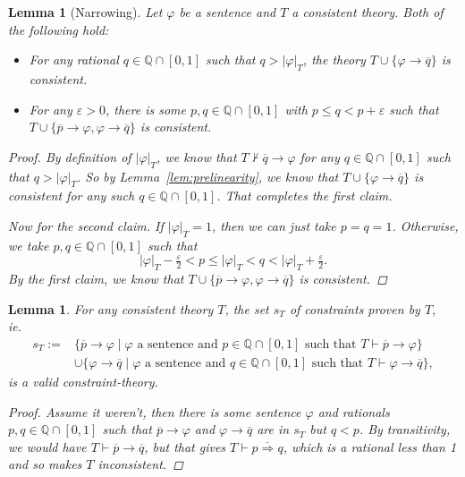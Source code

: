 \documentclass{amsart}
\newtheorem{lemma}[theorem]{Lemma}
\theoremstyle{definition}
\numberwithin{equation}{theorem}
\renewcommand{\phi}{\varphi}
\renewcommand{\epsilon}{\varepsilon}
\newcommand{\Q}{\mathbb{Q}}
\newcommand{\where}{\mid}
\newcommand{\proves}{\vdash}
\newcommand{\rat}[1]{{\overline{#1}}}
\newcommand{\narrow}[1]{\xrightarrow{#1}}
\renewcommand{\to}{\narrow{}}
\begin{document}
\begin{lemma}[Narrowing]\label{lem:narrowing}
  Let $\phi$ be a sentence and $T$ a consistent theory.
  Both of the following hold:
  \begin{itemize}
  \item For any rational $q\in\Q\cap[0,1]$ such that $q>|\phi|_T$, the theory $T\cup\{\phi\to\rat q\}$ is consistent.
  \item For any $\epsilon>0$, there is some $p,q\in\Q\cap[0,1]$ with $p\leq q<p+\epsilon$ such that $T\cup\{\rat p\to\phi, \phi\to\rat q\}$ is consistent.
  \end{itemize}
  \begin{proof}
    By definition of $|\phi|_T$, we know that $T\not\proves\rat q\to\phi$ for any $q\in\Q\cap[0,1]$ such that $q>|\phi|_T$.
    So by Lemma~\ref{lem:prelinearity}, we know that $T\cup\{\phi\to\rat q\}$ is consistent for any such $q\in\Q\cap[0,1]$.
    That completes the first claim.
    
    Now for the second claim.
    If $|\phi|_T=1$, then we can just take $p=q=1$.
    Otherwise, we take $p,q\in\Q\cap[0,1]$ such that
    \[
      |\phi|_T-\tfrac\epsilon2<p\leq|\phi|_T<q<|\phi|_T+\tfrac\epsilon2.
    \]
    By the first claim, we know that $T\cup\{\rat p\to\phi,\phi\to\rat q\}$ is consistent.
  \end{proof}
\end{lemma}
\begin{lemma}\label{lem:valid-constraint}
  For any consistent theory $T$, the set $s_T$ of constraints proven by $T$, ie.\ 
  \begin{align*}
    s_T:=&\{\rat p\to\phi\where\text{$\phi$ a sentence and $p\in\Q\cap[0,1]$ such that $T\proves\rat p\to\phi$}\}\\
    &\cup\{\phi\to\rat q\where\text{$\phi$ a sentence and $q\in\Q\cap[0,1]$ such that $T\proves\phi\to\rat q$}\},
  \end{align*}
  is a valid constraint-theory.
  \begin{proof}
    Assume it weren't, then there is some sentence $\phi$ and rationals $p,q\in\Q\cap[0,1]$ such that $\rat p\to\phi$ and $\phi\to\rat q$ are in $s_T$ but $q<p$.
    By transitivity, we would have $T\proves\rat p\to\rat q$, but that gives $T\proves\rat{p\Rightarrow q}$, which is a rational less than 1 and so makes $T$ inconsistent.
  \end{proof}
\end{lemma}
\end{document}

